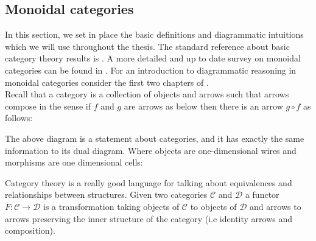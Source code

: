 \documentclass{article}
\begin{document}
\subsection{Monoidal categories}
In this section, we set in place the basic definitions and diagrammatic  intuitions which we will use throughout the thesis. The standard reference about basic category theory results is \cite{MacLane71}. A more detailed and up to date survey on monoidal categories can be found in \cite{Etingof15}. For an introduction to diagrammatic reasoning in monoidal categories consider the first two chapters of \cite{Coecke17}. \\
Recall that a category is a collection of objects and arrows such that arrows compose in the sense if $f$ and $g$ are arrows as below then there is an arrow $g \circ f$ as follows: 	
\begin{center}
\end{center}
The above diagram is a statement about categories, and it has exactly the same information to its dual diagram. Where objects are one-dimensional wires and morphisms are one dimensional cells:
\begin{center}
\end{center}
Category theory is a really good language for talking about equivalences and relationships between structures.
Given two categories $\mathcal{C}$ and $\mathcal{D}$ a functor $F: \mathcal{C} \rightarrow \mathcal{D}$ is a transformation taking objects of $\mathcal{C}$ to objects of $\mathcal{D}$ and arrows to arrows preserving the inner structure of the category (i.e identity arrows and composition).
\end{document}
